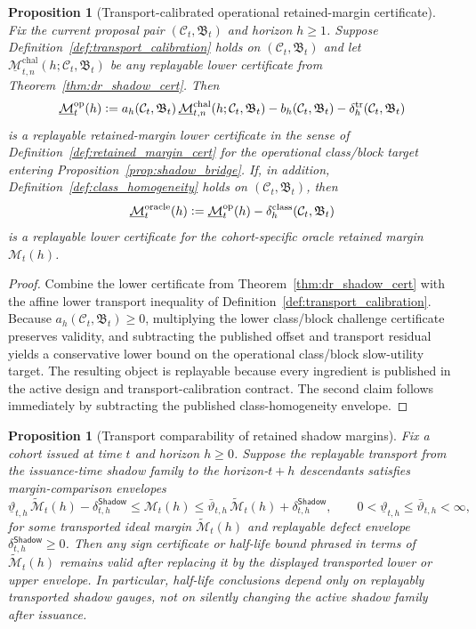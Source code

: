 \documentclass[11pt]{article}
\newtheorem{proposition}[theorem]{Proposition}
\theoremstyle{definition}
\newcommand{\1}{\mathbf{1}}
\newcommand{\Defeq}{\vcentcolon=}
\newcommand{\Shadow}{\mathsf{Shadow}}
\begin{document}
\begin{proposition}[Transport-calibrated operational retained-margin certificate]\label{prop:challenge_to_shadow}
Fix the current proposal pair $(\mathcal C_t,\mathfrak B_t)$ and horizon $h\ge1$. Suppose Definition~\ref{def:transport_calibration} holds on $(\mathcal C_t,\mathfrak B_t)$ and let $\underline{\mathcal M}_{t,n}^{\mathrm{chal}}(h;\mathcal C_t,\mathfrak B_t)$ be any replayable lower certificate from Theorem~\ref{thm:dr_shadow_cert}. Then
\[
\underline{\mathcal M}_t^{\mathrm{op}}(h)
\Defeq
 a_h(\mathcal C_t,\mathfrak B_t)\,\underline{\mathcal M}_{t,n}^{\mathrm{chal}}(h;\mathcal C_t,\mathfrak B_t)-b_h(\mathcal C_t,\mathfrak B_t)-\delta_h^{\mathrm{tr}}(\mathcal C_t,\mathfrak B_t)
\]
is a replayable retained-margin lower certificate in the sense of Definition~\ref{def:retained_margin_cert} for the operational class/block target entering Proposition~\ref{prop:shadow_bridge}. If, in addition, Definition~\ref{def:class_homogeneity} holds on $(\mathcal C_t,\mathfrak B_t)$, then
\[
\underline{\mathcal M}_t^{\mathrm{oracle}}(h)\Defeq \underline{\mathcal M}_t^{\mathrm{op}}(h)-\delta_h^{\mathrm{class}}(\mathcal C_t,\mathfrak B_t)
\]
is a replayable lower certificate for the cohort-specific oracle retained margin $\mathcal M_t(h)$.
\end{proposition}

\begin{proof}
Combine the lower certificate from Theorem~\ref{thm:dr_shadow_cert} with the affine lower transport inequality of Definition~\ref{def:transport_calibration}. Because $a_h(\mathcal C_t,\mathfrak B_t)\ge 0$, multiplying the lower class/block challenge certificate preserves validity, and subtracting the published offset and transport residual yields a conservative lower bound on the operational class/block slow-utility target. The resulting object is replayable because every ingredient is published in the active design and transport-calibration contract. The second claim follows immediately by subtracting the published class-homogeneity envelope.
\end{proof}

\begin{proposition}[Transport comparability of retained shadow margins]\label{prop:shadow_transport}
Fix a cohort issued at time $t$ and horizon $h\ge0$. Suppose the replayable transport from the issuance-time shadow family to the horizon-$t+h$ descendants satisfies margin-comparison envelopes
\[
\underline\vartheta_{t,h}\,\widetilde{\mathcal M}_t(h)-\delta_{t,h}^{\Shadow}
\le
\mathcal M_t(h)
\le
\bar\vartheta_{t,h}\,\widetilde{\mathcal M}_t(h)+\delta_{t,h}^{\Shadow},
\qquad
0<\underline\vartheta_{t,h}\le \bar\vartheta_{t,h}<\infty,
\]
for some transported ideal margin $\widetilde{\mathcal M}_t(h)$ and replayable defect envelope $\delta_{t,h}^{\Shadow}\ge0$. Then any sign certificate or half-life bound phrased in terms of $\widetilde{\mathcal M}_t(h)$ remains valid after replacing it by the displayed transported lower or upper envelope. In particular, half-life conclusions depend only on replayably transported shadow gauges, not on silently changing the active shadow family after issuance.
\end{proposition}
\end{document}
